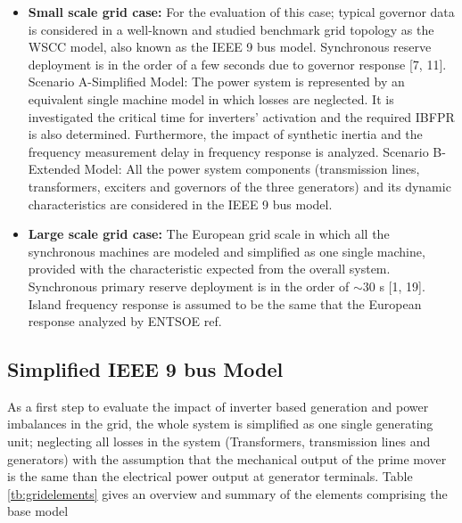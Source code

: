 \begin{itemize}[leftmargin=*,labelsep=5.8mm]
	\item \textbf{Small scale grid case:} For the evaluation of this case; typical governor data is considered in a well-known and studied benchmark grid topology as the WSCC model, also known as the IEEE 9 bus model. Synchronous reserve deployment is in the order of a few seconds due to governor response [7, 11].
	\subitem Scenario A-Simplified Model: The power system is represented by an equivalent single machine model in which losses are neglected. It is investigated the critical time for inverters' activation and the required IBFPR is  also determined. Furthermore, the impact of synthetic inertia and the frequency measurement delay in frequency response is analyzed.
	\subitem Scenario B-Extended Model: All the power system components (transmission lines, transformers, exciters and governors of the three generators) and its dynamic characteristics are considered in the IEEE 9 bus model.\\
	\item \textbf{Large scale grid case:} The European grid scale in which all the synchronous machines are modeled and simplified as one single machine, provided with the characteristic expected from the overall system. Synchronous primary reserve deployment is in the order of $ \sim30 $ s [1, 19]. Island frequency response is assumed to be the same that the European response analyzed by ENTSOE ref.
\end{itemize}



\subsection{Simplified IEEE 9 bus Model}
\label{ssec:simpleieee}
As a first step to evaluate the impact of inverter based generation and power imbalances in the grid, the whole system is simplified as one single generating unit; neglecting all losses in the system (Transformers, transmission lines and generators) with the assumption that the mechanical output of the prime mover is the same than the electrical power output at generator terminals. Table \ref{tb:gridelements} gives an overview and summary of the elements comprising the base model\\


